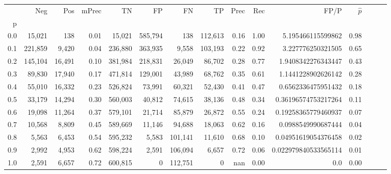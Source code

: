 \begin{tabular}{rrrrrrrrrrrrrrr}
\toprule
{} &      Neg &     Pos & mPrec &       TN &       FP &       FN &       TP &  Prec &   Rec &                  FP/P & $\hat{p}$ \\
p   &          &         &       &          &          &          &          &       &       &                       &           \\
\midrule
0.0 &   15,021 &     138 &  0.01 &   15,021 &  585,794 &      138 &  112,613 &  0.16 &  1.00 &     5.195466115599862 &      0.98 \\
0.1 &  221,859 &   9,420 &  0.04 &  236,880 &  363,935 &    9,558 &  103,193 &  0.22 &  0.92 &     3.227776250321505 &      0.65 \\
0.2 &  145,104 &  16,491 &  0.10 &  381,984 &  218,831 &   26,049 &   86,702 &  0.28 &  0.77 &    1.9408342276343447 &      0.43 \\
0.3 &   89,830 &  17,940 &  0.17 &  471,814 &  129,001 &   43,989 &   68,762 &  0.35 &  0.61 &    1.1441228902626142 &      0.28 \\
0.4 &   55,010 &  16,332 &  0.23 &  526,824 &   73,991 &   60,321 &   52,430 &  0.41 &  0.47 &    0.6562336475951432 &      0.18 \\
0.5 &   33,179 &  14,294 &  0.30 &  560,003 &   40,812 &   74,615 &   38,136 &  0.48 &  0.34 &   0.36196574753217264 &      0.11 \\
0.6 &   19,098 &  11,264 &  0.37 &  579,101 &   21,714 &   85,879 &   26,872 &  0.55 &  0.24 &   0.19258365779460937 &      0.07 \\
0.7 &   10,568 &   8,809 &  0.45 &  589,669 &   11,146 &   94,688 &   18,063 &  0.62 &  0.16 &    0.0988549990687444 &      0.04 \\
0.8 &    5,563 &   6,453 &  0.54 &  595,232 &    5,583 &  101,141 &   11,610 &  0.68 &  0.10 &   0.04951619054376458 &      0.02 \\
0.9 &    2,992 &   4,953 &  0.62 &  598,224 &    2,591 &  106,094 &    6,657 &  0.72 &  0.06 &  0.022979840533565114 &      0.01 \\
1.0 &    2,591 &   6,657 &  0.72 &  600,815 &        0 &  112,751 &        0 &   nan &  0.00 &                   0.0 &      0.00 \\
\bottomrule
\end{tabular}
